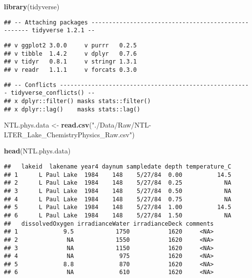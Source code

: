 \documentclass[]{article}
\newenvironment{Shaded}{\begin{snugshade}}{\end{snugshade}}
\newcommand{\KeywordTok}[1]{\textcolor[rgb]{0.13,0.29,0.53}{\textbf{#1}}}
\newcommand{\StringTok}[1]{\textcolor[rgb]{0.31,0.60,0.02}{#1}}
\newcommand{\NormalTok}[1]{#1}
\begin{document}
\begin{Shaded}
\begin{Highlighting}[]
\KeywordTok{library}\NormalTok{(tidyverse)}
\end{Highlighting}
\end{Shaded}

\begin{verbatim}
## -- Attaching packages ---------------------------------------------------- tidyverse 1.2.1 --
\end{verbatim}

\begin{verbatim}
## v ggplot2 3.0.0     v purrr   0.2.5
## v tibble  1.4.2     v dplyr   0.7.6
## v tidyr   0.8.1     v stringr 1.3.1
## v readr   1.1.1     v forcats 0.3.0
\end{verbatim}

\begin{verbatim}
## -- Conflicts ------------------------------------------------------- tidyverse_conflicts() --
## x dplyr::filter() masks stats::filter()
## x dplyr::lag()    masks stats::lag()
\end{verbatim}

\begin{Shaded}
\begin{Highlighting}[]
\NormalTok{NTL.phys.data <-}\StringTok{ }\KeywordTok{read.csv}\NormalTok{(}\StringTok{"./Data/Raw/NTL-LTER_Lake_ChemistryPhysics_Raw.csv"}\NormalTok{)}

\KeywordTok{head}\NormalTok{(NTL.phys.data)}
\end{Highlighting}
\end{Shaded}

\begin{verbatim}
##   lakeid  lakename year4 daynum sampledate depth temperature_C
## 1      L Paul Lake  1984    148    5/27/84  0.00          14.5
## 2      L Paul Lake  1984    148    5/27/84  0.25            NA
## 3      L Paul Lake  1984    148    5/27/84  0.50            NA
## 4      L Paul Lake  1984    148    5/27/84  0.75            NA
## 5      L Paul Lake  1984    148    5/27/84  1.00          14.5
## 6      L Paul Lake  1984    148    5/27/84  1.50            NA
##   dissolvedOxygen irradianceWater irradianceDeck comments
## 1             9.5            1750           1620     <NA>
## 2              NA            1550           1620     <NA>
## 3              NA            1150           1620     <NA>
## 4              NA             975           1620     <NA>
## 5             8.8             870           1620     <NA>
## 6              NA             610           1620     <NA>
\end{verbatim}
\end{document}
